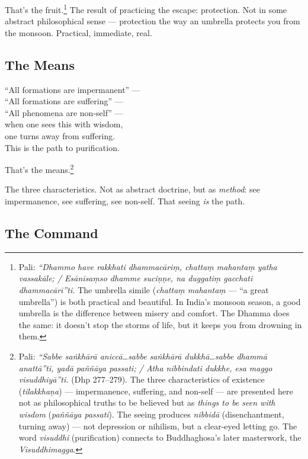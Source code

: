 That's the fruit.\footnote{Pali: \textit{``Dhammo have rakkhati dhammacāriṃ, chattaṃ mahantaṃ yatha vassakāle; / Esānisaṃso dhamme suciṇṇe, na duggatiṃ gacchati dhammacārī''ti.} The umbrella simile (\textit{chattaṃ mahantaṃ} --- ``a great umbrella'') is both practical and beautiful. In India's monsoon season, a good umbrella is the difference between misery and comfort. The Dhamma does the same: it doesn't stop the storms of life, but it keeps you from drowning in them.} The result of practicing the escape: protection. Not in some abstract philosophical sense --- protection the way an umbrella protects you from the monsoon. Practical, immediate, real.

\subsection*{The Means}

\begin{versebox}
``All formations are impermanent'' ---\\
``All formations are suffering'' ---\\
``All phenomena are non-self'' ---\\
when one sees this with wisdom,\\
one turns away from suffering.\\
This is the path to purification.
\end{versebox}

That's the means.\footnote{Pali: \textit{``Sabbe saṅkhārā aniccā\ldots sabbe saṅkhārā dukkhā\ldots sabbe dhammā anattā''ti, yadā paññāya passati; / Atha nibbindati dukkhe, esa maggo visuddhiyā''ti.} (Dhp 277--279). The three characteristics of existence (\textit{tilakkhaṇa}) --- impermanence, suffering, and non-self --- are presented here not as philosophical truths to be believed but as \textit{things to be seen with wisdom} (\textit{paññāya passati}). The seeing produces \textit{nibbidā} (disenchantment, turning away) --- not depression or nihilism, but a clear-eyed letting go. The word \textit{visuddhi} (purification) connects to Buddhaghosa's later masterwork, the \textit{Visuddhimagga}.}

The three characteristics. Not as abstract doctrine, but as \textit{method}: see impermanence, see suffering, see non-self. That seeing \textit{is} the path.

\subsection*{The Command}

